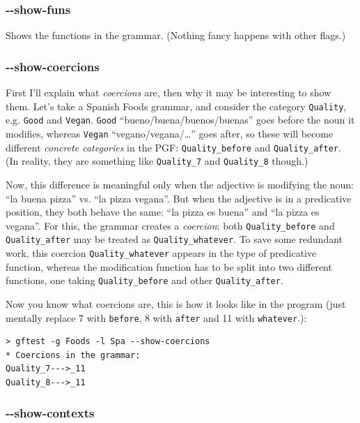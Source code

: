 \hypertarget{show-funs}{%
\subsubsection{-\/-show-funs}\label{show-funs}}

Shows the functions in the grammar. (Nothing fancy happens with other
flags.)

\hypertarget{show-coercions}{%
\subsubsection{-\/-show-coercions}\label{show-coercions}}

First I'll explain what \emph{coercions} are, then why it may be
interesting to show them. Let's take a Spanish Foods grammar, and
consider the category \texttt{Quality}, e.g. \texttt{Good} and
\texttt{Vegan}. \texttt{Good} ``bueno/buena/buenos/buenas'' goes before
the noun it modifies, whereas \texttt{Vegan} ``vegano/vegana/\ldots{}''
goes after, so these will become different \emph{concrete categories} in
the PGF: \texttt{Quality\_before} and \texttt{Quality\_after}. (In
reality, they are something like \texttt{Quality\_7} and
\texttt{Quality\_8} though.)

Now, this difference is meaningful only when the adjective is modifying
the noun: ``la buena pizza'' vs. ``la pizza vegana''. But when the
adjective is in a predicative position, they both behave the same: ``la
pizza es buena'' and ``la pizza es vegana''. For this, the grammar
creates a \emph{coercion}: both \texttt{Quality\_before} and
\texttt{Quality\_after} may be treated as \texttt{Quality\_whatever}. To
save some redundant work, this coercion \texttt{Quality\_whatever}
appears in the type of predicative function, whereas the modification
function has to be split into two different functions, one taking
\texttt{Quality\_before} and other \texttt{Quality\_after}.

Now you know what coercions are, this is how it looks like in the
program (just mentally replace 7 with \texttt{before}, 8 with \texttt{after} and
11 with \texttt{whatever}.):

\begin{verbatim}
> gftest -g Foods -l Spa --show-coercions
* Coercions in the grammar:
Quality_7--->_11
Quality_8--->_11
\end{verbatim}


\hypertarget{show-contexts}{%
\subsubsection{-\/-show-contexts}\label{show-contexts}}

